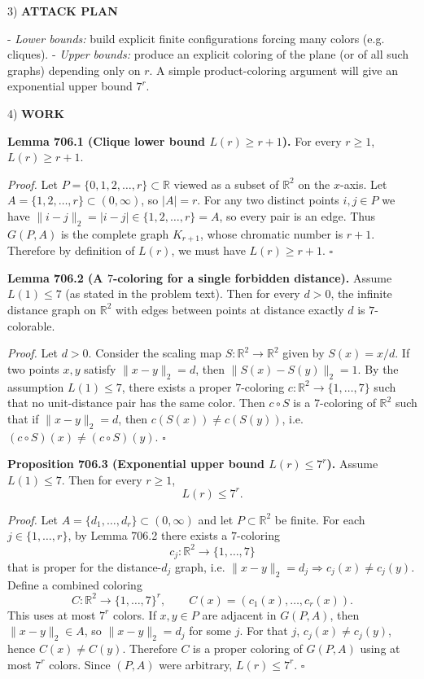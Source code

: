 3) \textbf{ATTACK PLAN}

- \emph{Lower bounds:} build explicit finite configurations forcing many colors (e.g. cliques).
- \emph{Upper bounds:} produce an explicit coloring of the plane (or of all such graphs) depending only on $r$.
A simple product-coloring argument will give an exponential upper bound $7^r$.

4) \textbf{WORK}

\textbf{Lemma 706.1 (Clique lower bound $L(r)\ge r+1$).}
For every $r\ge 1$, $L(r)\ge r+1$.

\textit{Proof.}
Let $P=\{0,1,2,\dots,r\}\subset\mathbb{R}$ viewed as a subset of $\mathbb{R}^2$ on the $x$-axis.
Let $A=\{1,2,\dots,r\}\subset(0,\infty)$, so $|A|=r$.
For any two distinct points $i,j\in P$ we have $\|i-j\|_2=|i-j|\in\{1,2,\dots,r\}=A$, so every pair is an edge.
Thus $G(P,A)$ is the complete graph $K_{r+1}$, whose chromatic number is $r+1$.
Therefore by definition of $L(r)$, we must have $L(r)\ge r+1$.
\hfill$\square$

\textbf{Lemma 706.2 (A $7$-coloring for a single forbidden distance).}
Assume $L(1)\le 7$ (as stated in the problem text). Then for every $d>0$, the infinite distance graph on $\mathbb{R}^2$ with edges between points at distance exactly $d$ is $7$-colorable.

\textit{Proof.}
Let $d>0$.
Consider the scaling map $S:\mathbb{R}^2\to\mathbb{R}^2$ given by $S(x)=x/d$.
If two points $x,y$ satisfy $\|x-y\|_2=d$, then $\|S(x)-S(y)\|_2=1$.
By the assumption $L(1)\le 7$, there exists a proper $7$-coloring $c:\mathbb{R}^2\to\{1,\dots,7\}$ such that no unit-distance pair has the same color.
Then $c\circ S$ is a $7$-coloring of $\mathbb{R}^2$ such that if $\|x-y\|_2=d$, then $c(S(x))\ne c(S(y))$, i.e. $(c\circ S)(x)\ne (c\circ S)(y)$.
\hfill$\square$

\textbf{Proposition 706.3 (Exponential upper bound $L(r)\le 7^r$).}
Assume $L(1)\le 7$.
Then for every $r\ge 1$,
\[
L(r)\le 7^r.
\]

\textit{Proof.}
Let $A=\{d_1,\dots,d_r\}\subset(0,\infty)$ and let $P\subset\mathbb{R}^2$ be finite.
For each $j\in\{1,\dots,r\}$, by Lemma 706.2 there exists a $7$-coloring
\[
 c_j:\mathbb{R}^2\to\{1,\dots,7\}
\]
that is proper for the distance-$d_j$ graph, i.e. $\|x-y\|_2=d_j\Rightarrow c_j(x)\ne c_j(y)$.
Define a combined coloring
\[
 C:\mathbb{R}^2\to\{1,\dots,7\}^r,\qquad C(x)=(c_1(x),\dots,c_r(x)).
\]
This uses at most $7^r$ colors.
If $x,y\in P$ are adjacent in $G(P,A)$, then $\|x-y\|_2\in A$, so $\|x-y\|_2=d_j$ for some $j$.
For that $j$, $c_j(x)\ne c_j(y)$, hence $C(x)\ne C(y)$.
Therefore $C$ is a proper coloring of $G(P,A)$ using at most $7^r$ colors.
Since $(P,A)$ were arbitrary, $L(r)\le 7^r$.
\hfill$\square$

